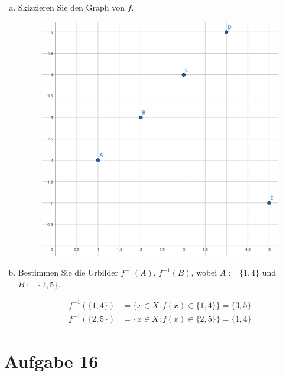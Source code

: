\documentclass[10pt, oneside]{article}
\begin{document}
\begin{enumerate}[(a)]
    \item Skizzieren Sie den Graph von $f$.
        \vspace{15pt}
        \begin{figure}[h]
            \centering
            \includegraphics{./assets/13-01.png}
        \end{figure}

    \item Bestimmen Sie die Urbilder $f^{-1}(A)$, $f^{-1}(B)$, wobei $A := \{1,4\}$
        und $B := \{2,5\}$.

        \begin{equation*}
            \begin{aligned}
                f^{-1}(\{1, 4\}) &= \{x \in X : f(x) \in \{1, 4\}\} = \{3, 5\} \\[5pt]
                f^{-1}(\{2, 5\}) &= \{x \in X : f(x) \in \{2, 5\}\} = \{1, 4\}
            \end{aligned}
        \end{equation*}

\end{enumerate}

\pagebreak
\section{Aufgabe 16}
\setcounter{section}{16}
\end{document}
